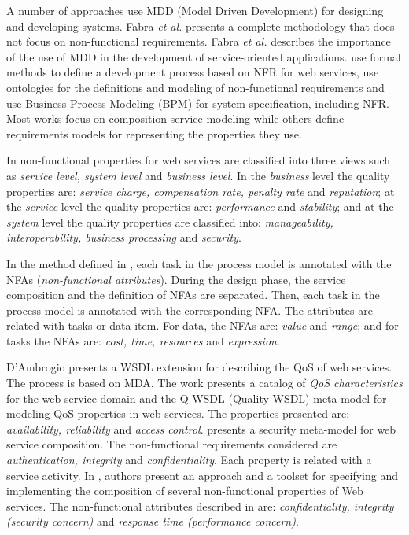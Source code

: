 A number of approaches use
\cite{DAmbrogio06,CholletL09,SchmelingCM11,BasinDL06,Fabra2011,OvaskaEHPA10} MDD
(Model Driven Development) for designing and developing systems. Fabra
\textit{et al.} \cite{Fabra2011} presents a complete methodology that does not
focus on non-functional requirements. Fabra \textit{et al.} \cite{Fabra2011}
describes the importance of the use of MDD in the development of service-oriented applications. \cite{ThissenW06,ZhangPSP05} use formal methods to define a development process based on NFR for web services,
\cite{AgarwalLS09,PastranaPK11} use ontologies for the definitions and
modeling of non-functional requirements and \cite{XiaoCZBOLH08,GutierrezRF10} use Business Process Modeling (BPM) for
system specification, including NFR. Most works focus on composition
service modeling while others define requirements models for representing the
properties they use.

In \cite{Babamir2010,Yeom2006} non-functional properties for web services
are classified into three views such as
\textit{service level, system level} and \textit{business level}.
In the \textit{\textit{business}} level the quality properties are:
\textit{service charge, compensation rate, penalty rate} and
\textit{reputation}; at the \textit{\textit{service}} level the quality
properties are: \textit{performance} and \textit{stability}; and at the
\textit{system} level the quality properties are classified into:
\textit{manageability, interoperability, business processing} and
\textit{security}.

In the method defined in \cite{XiaoCZBOLH08}, each task in the process model is
annotated with the NFAs (\textit{non-functional attributes}). During the design phase, the
service composition and the definition of NFAs are separated. Then,
each task in the process model is annotated with the corresponding NFA. The
attributes are related with tasks or data item. For data, the NFAs are:
\textit{value} and \textit{range}; and for tasks the NFAs are: \textit{cost,
time, resources} and \textit{expression}.

D'Ambrogio \cite{DAmbrogio06} presents a WSDL extension for describing the QoS
of web services. The process is based on MDA. The work presents a catalog
of \textit{QoS characteristics} for the web service domain and the Q-WSDL
(Quality WSDL) meta-model for modeling QoS properties in web services. The properties
presented are: \textit{availability, reliability} and \textit{access
control}. \cite{CholletL09} presents a security meta-model for web service
composition. The non-functional requirements considered are
\textit{authentication, integrity} and \textit{confidentiality}. Each property is related with a service activity. In \cite{SchmelingCM11}, authors
present an approach and a toolset for specifying and implementing the
composition of several non-functional properties of Web services. The
non-functional attributes described in \cite{SchmelingCM11} are: \textit{confidentiality, integrity
(security concern)} and \textit{response time (performance concern)}.

